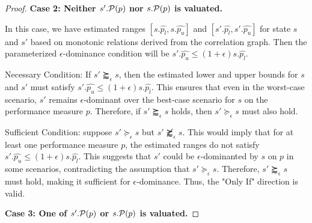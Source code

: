{\begin{proof}
\sstab
\textbf{Case 2: Neither $s'.\P(p)$ nor $s.\P(p)$ is valuated.}

In this case, 
we have estimated ranges $[s.\hat{p_l}, s.\hat{p_u}]$ and $[s'.\hat{p_l}, s'.\hat{p_u}]$ for state $s$ and $s'$ based on monotonic relations derived from the correlation graph. 
Then the parameterized $\epsilon$-dominance condition will be
$s'.\hat{p_u} \leq (1+\epsilon) s.\hat{p_l}$.
\bi
\item Necessary Condition: If $s' \succapprox_{\epsilon} s$, then the estimated lower and upper bounds for $s$ and $s'$ must satisfy $s'.\hat{p_u} \leq (1+\epsilon) s.\hat{p_l}$. 
This ensures that even in the worst-case scenario, $s'$ remains $\epsilon$-dominant over the best-case scenario for $s$ on the performance measure $p$.
Therefore, if $s' \succapprox_{\epsilon} s$ holds, then $s'\succeq_\epsilon s$ must also hold.
\item Sufficient Condition: suppose $s'\succeq_\epsilon s$ but $s' \not\succapprox_{\epsilon} s$. This would imply that for at least one performance measure $p$, the estimated ranges do not satisfy $s'.\hat{p_u} \leq (1+\epsilon) s.\hat{p_l}$. 
This suggests that $s'$ could be $\epsilon$-dominanted by $s$ on $p$ in some scenarios, contradicting the assumption that $s'\succeq_\epsilon s$. Therefore, $s' \succapprox_{\epsilon} s$ must hold, making it sufficient for $\epsilon$-dominance. Thus, the "Only If" direction is valid.
\ei

\sstab
\textbf{Case 3: One of $s'.\P(p)$ or $s.\P(p)$ is valuated.}


\end{proof}}
